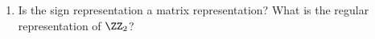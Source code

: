 \documentclass{math174}
\date{Monday, January 28}
\author{}
\begin{document}
\begin{enumerate}
\item Is the sign representation a matrix representation?  What is the
  regular representation of \(\ZZ_2\)?
  \begin{solution}
  \end{solution}
\end{enumerate}
\end{document}
